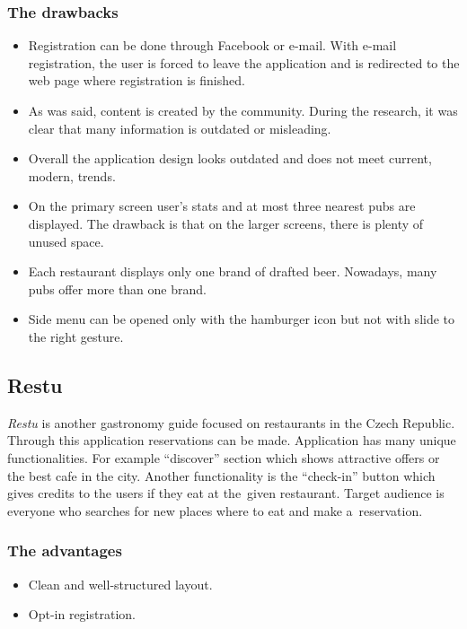 \subsubsection{The drawbacks}
\begin{itemize}
    \item Registration can be done through Facebook or e-mail. With e-mail registration, the user is forced to leave the application and is redirected to the web page where registration is finished.
    \item As was said, content is created by the community. During the research, it was clear that many information is outdated or misleading. 
    \item Overall the application design looks outdated and does not meet current, modern,  trends.
    \item On the primary screen user's stats and at most three nearest pubs are displayed. The drawback is that on the larger screens, there is plenty of unused space. 
    \item Each restaurant displays only one brand of drafted beer. Nowadays, many pubs offer more than one brand. 
    \item Side menu can be opened only with the hamburger icon but not with slide to the right gesture.
\end{itemize}

\subsection{Restu}
\textit{Restu} is another gastronomy guide focused on restaurants in the Czech Republic. Through this application reservations can be made. Application has many unique functionalities. For example ``discover'' section which shows attractive offers or the best cafe in the city. Another functionality is the ``check-in'' button which gives credits to the users if they eat at the~given restaurant. Target audience is everyone who searches for new places where to eat and make a~reservation.


\subsubsection{The advantages}
\begin{itemize}
    \item Clean and well-structured layout.
    \item Opt-in registration.
\end{itemize}

